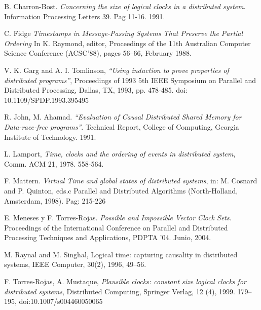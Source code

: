\documentclass[12pt, times]{simauth}
\begin{document}
\begin{thebibliography}{9}

     B. Charron-Bost. \textit{Concerning the size of logical clocks in a distributed system}. Information Processing Letters 39. Pag 11-16. 1991.

     C. Fidge \textit{Timestamps in Message-Passing Systems That Preserve the Partial Ordering}  In K. Raymond, editor, Proceedings of the 11th Australian Computer Science Conference (ACSC'88), pages 56–66, February 1988.
    
     V. K. Garg and A. I. Tomlinson, \textit{``Using induction to prove properties of distributed programs''}, Proceedings of 1993 5th IEEE Symposium on Parallel and Distributed Processing, Dallas, TX, 1993, pp. 478-485.
doi: 10.1109/SPDP.1993.395495 

     R. John, M. Ahamad. \textit{``Evaluation of Causal Distributed Shared Memory for Data-race-free programs''}. Technical Report, College of Computing, Georgia Institute of Technology. 1991.   
    
     L. Lamport, \textit{Time, clocks and the ordering of events in distributed system}, Comm. ACM 21, 1978. 558-564.

     F. Mattern. \textit{Virtual Time and global states of distributed systems}, in: M. Cosnard and P. Quinton, eds.c Parallel and Distributed Algorithms (North-Holland, Amsterdam, 1998). Pag: 215-226
    
     E. Meneses y F. Torres-Rojas. \textit{Possible and Impossible Vector  Clock  Sets}. Proceedings  of  the  International  Conference  on  Parallel and Distributed Processing Techniques and Applications, PDPTA ’04. Junio, 2004.    
    
     M. Raynal and M. Singhal, Logical time: capturing causality in distributed systems, IEEE Computer, 30(2), 1996, 49–56.
    
     F. Torres-Rojas, A. Mustaque, \textit{Plausible clocks: constant size logical clocks for distributed systems}, Distributed Computing, Springer Verlag, 12 (4), 1999. 179–195, doi:10.1007/s004460050065
    
\end{thebibliography}  

       
\end{document}

